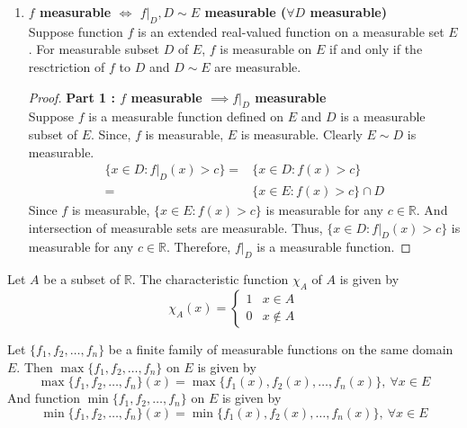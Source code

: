 \begin{enumerate}
\begin{proof}
		Clearly, $\{ x \in A : g(x) > c \}$ is a subset of a set of measurse zero and thus measurable.
                Also, $E \sim A$ measurable since both $E$ and $A$ are measurable.
		And since $f$ is measurable, $\{ x \in E : f(x) > c\}$ is measurable.
                Thus, $\{ x \in E : g(x) > c\}$ is measurable for any $c \in \mathbb{R}$.
		Therefore, $g$ is a measurable function.
	\end{proof}
\item \textbf{$f$ measurable $\iff$ $f|_D, D \sim E$ measurable ($\forall D$ measurable)}\\
	Suppose function $f$ is an extended real-valued function on a measurable set $E$.
	For measurable subset $D$ of $E$, $f$ is measurable on $E$ if and only if the resctriction of $f$ to $D$ and $D \sim E$ are measurable.
	\begin{proof}
		\textbf{Part 1 : $f$ measurable $\implies f|_D$ measurable}\\
   		Suppose $f$ is a measurable function defined on $E$ and $D$ is a measurable subset of $E$.
		Since, $f$ is measurable, $E$ is measurable.
		Clearly $E \sim D$ is measurable.
		\begin{align*}
			\{ x \in D : f|_D(x) > c \} = & \{ x \in D : f(x) > c \} \\
			= & \{ x \in E : f(x) > c\} \cap D
		\end{align*}
		Since $f$ is measurable, $\{ x \in E : f(x) > c\}$ is measurable for any $c \in \mathbb{R}$.
		And intersection of measurable sets are measurable.
		Thus, $\{ x \in D : f|_D(x) > c\}$ is measurable for any $c \in \mathbb{R}$.
		Therefore, $f|_D$ is a measurable function.
	\end{proof}
\end{enumerate}

\begin{definition}
	Let $A$ be a subset of $\mathbb{R}$.
	The characteristic function $\chi_A$ of $A$ is given by
	\begin{equation}
		\chi_A(x) = \begin{cases} 1 & x \in A \\ 0 & x \notin A  \end{cases}
	\end{equation}
\end{definition}
\begin{definition}
	Let $\{f_1,f_2,\dots,f_n \}$ be a finite family of measurable functions on the same domain $E$.
	Then $\max\{f_1,f_2,\dots,f_n\}$ on $E$ is given by
	\begin{equation}
	\max\{f_1,f_2,\dots,f_n\}(x) = \max\{f_1(x),f_2(x),\dots,f_n(x)\},\ \forall x \in E
	\end{equation}
	And function $\min\{f_1,f_2,\dots,f_n\}$ on $E$ is given by
	\begin{equation}
	\min\{f_1,f_2,\dots,f_n\}(x) = \min\{f_1(x),f_2(x),\dots,f_n(x)\},\ \forall x \in E
	\end{equation}
\end{definition}
